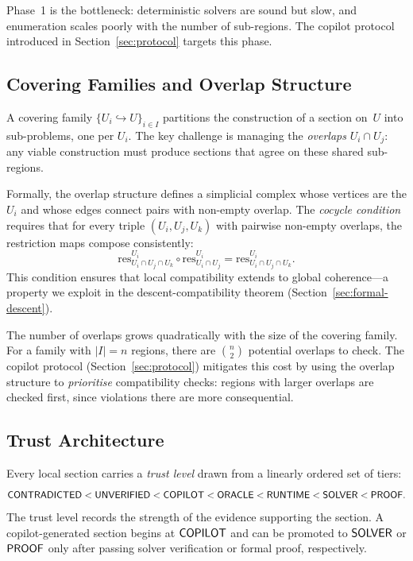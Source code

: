 \documentclass[11pt]{article}
\newcommand{\restrict}{\mathrm{res}}
\begin{document}
Phase~1 is the bottleneck: deterministic solvers are sound but slow,
and enumeration scales poorly with the number of sub-regions.  The
copilot protocol introduced in Section~\ref{sec:protocol} targets
this phase.

\subsection{Covering Families and Overlap
            Structure}\label{sec:bg-covering}

A covering family $\{U_i \hookrightarrow U\}_{i \in I}$ partitions
the construction of a section on~$U$ into sub-problems, one per
$U_i$.  The key challenge is managing the \emph{overlaps}
$U_i \cap U_j$: any viable construction must produce sections that
agree on these shared sub-regions.

Formally, the overlap structure defines a simplicial complex whose
vertices are the $U_i$ and whose edges connect pairs with non-empty
overlap.  The \emph{cocycle condition} requires that for every
triple $(U_i, U_j, U_k)$ with pairwise non-empty overlaps, the
restriction maps compose consistently:
\[
  \restrict^{U_i}_{U_i \cap U_j \cap U_k} \circ
  \restrict^{U_i}_{U_i \cap U_j}
  = \restrict^{U_i}_{U_i \cap U_j \cap U_k}.
\]
This condition ensures that local compatibility extends to global
coherence---a property we exploit in the descent-compatibility
theorem (Section~\ref{sec:formal-descent}).

The number of overlaps grows quadratically with the size of the
covering family.  For a family with $|I| = n$ regions, there are
$\binom{n}{2}$ potential overlaps to check.  The copilot protocol
(Section~\ref{sec:protocol}) mitigates this cost by using the
overlap structure to \emph{prioritise} compatibility checks:
regions with larger overlaps are checked first, since violations
there are more consequential.

\subsection{Trust Architecture}\label{sec:bg-trust}

Every local section carries a \emph{trust level} drawn from a
linearly ordered set of tiers:
\[
  \mathsf{CONTRADICTED} < \mathsf{UNVERIFIED} < \mathsf{COPILOT} < \mathsf{ORACLE}
  < \mathsf{RUNTIME} < \mathsf{SOLVER} < \mathsf{PROOF}.
\]
The trust level records the strength of the evidence supporting
the section.  A copilot-generated section begins at $\mathsf{COPILOT}$
and can be promoted to $\mathsf{SOLVER}$ or $\mathsf{PROOF}$ only after passing
solver verification or formal proof, respectively.
\end{document}
